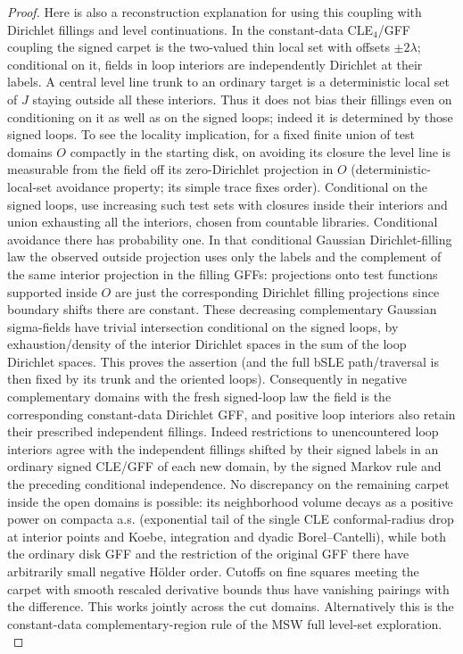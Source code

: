 \begin{proof}
Here is also a reconstruction explanation for using this coupling with Dirichlet fillings and level continuations.
In the constant-data CLE\(_4\)/GFF coupling the signed carpet is the two-valued thin local set with offsets \(\pm2\lambda\); conditional on it, fields in loop interiors are independently Dirichlet at their labels. A central level line trunk to an ordinary target is a deterministic local set of \(J\) staying outside all these interiors.
Thus it does not bias their fillings even on conditioning on it as well as on the signed loops; indeed it is determined by those signed loops.
To see the locality implication, for a fixed finite union of test domains \(O\) compactly in the starting disk, on avoiding its closure the level line is measurable from the field off its zero-Dirichlet projection in \(O\) (deterministic-local-set avoidance property; its simple trace fixes order).
Conditional on the signed loops, use increasing such test sets with closures inside their interiors and union exhausting all the interiors, chosen from countable libraries.
Conditional avoidance there has probability one.
In that conditional Gaussian Dirichlet-filling law the observed outside projection uses only the labels and the complement of the same interior projection in the filling GFFs: projections onto test functions supported inside \(O\) are just the corresponding Dirichlet filling projections since boundary shifts there are constant.
These decreasing complementary Gaussian sigma-fields have trivial intersection conditional on the signed loops, by exhaustion/density of the interior Dirichlet spaces in the sum of the loop Dirichlet spaces.
This proves the assertion (and the full bSLE path/traversal is then fixed by its trunk and the oriented loops).
Consequently in negative complementary domains with the fresh signed-loop law the field is the corresponding constant-data Dirichlet GFF, and positive loop interiors also retain their prescribed independent fillings.
Indeed restrictions to unencountered loop interiors agree with the independent fillings shifted by their signed labels in an ordinary signed CLE/GFF of each new domain, by the signed Markov rule and the preceding conditional independence.
No discrepancy on the remaining carpet inside the open domains is possible: its neighborhood volume decays as a positive power on compacta a.s. (exponential tail of the single CLE conformal-radius drop at interior points and Koebe, integration and dyadic Borel--Cantelli), while both the ordinary disk GFF and the restriction of the original GFF there have arbitrarily small negative Hölder order.
Cutoffs on fine squares meeting the carpet with smooth rescaled derivative bounds thus have vanishing pairings with the difference.
This works jointly across the cut domains.
Alternatively this is the constant-data complementary-region rule of the MSW full level-set exploration. \citep[Proposition~5.3]{MSWTrunk}


\end{proof}
